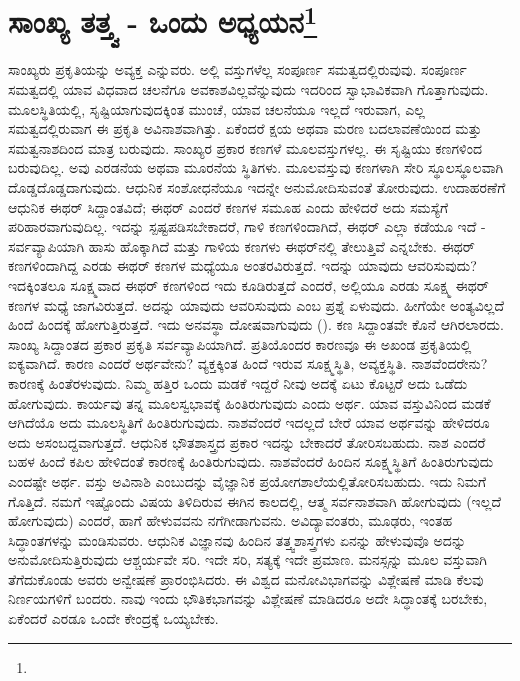 
\chapter[ಸಾಂಖ್ಯ ತತ್ತ್ವ - ಒಂದು ಅಧ್ಯಯನ]{ಸಾಂಖ್ಯ ತತ್ತ್ವ - ಒಂದು ಅಧ್ಯಯನ\protect\footnote{}}

ಸಾಂಖ್ಯರು ಪ್ರಕೃತಿಯನ್ನು ಅವ್ಯಕ್ತ ಎನ್ನುವರು. ಅಲ್ಲಿ ವಸ್ತುಗಳೆಲ್ಲ ಸಂಪೂರ್ಣ ಸಮತ್ವದಲ್ಲಿರುವುವು. ಸಂಪೂರ್ಣ ಸಮತ್ವದಲ್ಲಿ ಯಾವ ವಿಧವಾದ ಚಲನೆಗೂ ಅವಕಾಶವಿಲ್ಲವೆನ್ನುವುದು ಇದರಿಂದ ಸ್ವಾಭಾವಿಕವಾಗಿ ಗೊತ್ತಾಗುವುದು. ಮೂಲಸ್ಥಿತಿಯಲ್ಲಿ, ಸೃಷ್ಟಿಯಾಗುವುದಕ್ಕಿಂತ ಮುಂಚೆ, ಯಾವ ಚಲನೆಯೂ ಇಲ್ಲದೆ ಇರುವಾಗ, ಎಲ್ಲ ಸಮತ್ವದಲ್ಲಿರುವಾಗ ಈ ಪ್ರಕೃತಿ ಅವಿನಾಶವಾಗಿತ್ತು. ಏಕೆಂದರೆ ಕ್ಷಯ ಅಥವಾ ಮರಣ ಬದಲಾವಣೆಯಿಂದ ಮತ್ತು ಸಮತ್ವನಾಶದಿಂದ ಮಾತ್ರ ಬರುವುದು. ಸಾಂಖ್ಯರ ಪ್ರಕಾರ ಕಣಗಳೆ ಮೂಲವಸ್ತುಗಳಲ್ಲ. ಈ ಸೃಷ್ಟಿಯು ಕಣಗಳಿಂದ ಬರುವುದಿಲ್ಲ. ಅವು ಎರಡನೆಯ ಅಥವಾ ಮೂರನೆಯ ಸ್ಥಿತಿಗಳು. ಮೂಲವಸ್ತುವು ಕಣಗಳಾಗಿ ಸೇರಿ ಸ್ಥೂಲಸ್ಥೂಲವಾಗಿ ದೊಡ್ಡದೊಡ್ಡದಾಗುವುದು. ಆಧುನಿಕ ಸಂಶೋಧನೆಯೂ ಇದನ್ನೇ ಅನುಮೋದಿಸುವಂತೆ ತೋರುವುದು. ಉದಾಹರಣೆಗೆ ಆಧುನಿಕ ಈಥರ್ ಸಿದ್ದಾಂತವಿದೆ; ಈಥರ್ ಎಂದರೆ ಕಣಗಳ ಸಮೂಹ ಎಂದು ಹೇಳಿದರೆ ಅದು ಸಮಸ್ಯೆಗೆ ಪರಿಹಾರವಾಗುವುದಿಲ್ಲ. ಇದನ್ನು ಸ್ಪಷ್ಟಪಡಿಸಬೇಕಾದರೆ, ಗಾಳಿ ಕಣಗಳಿಂದಾಗಿದೆ, ಈಥರ್‌ ಎಲ್ಲಾ ಕಡೆಯೂ ಇದೆ - ಸರ್ವವ್ಯಾಪಿಯಾಗಿ ಹಾಸು ಹೊಕ್ಕಾಗಿದೆ ಮತ್ತು ಗಾಳಿಯ ಕಣಗಳು ಈಥರ್‌ನಲ್ಲಿ ತೇಲುತ್ತಿವೆ ಎನ್ನಬೇಕು. ಈಥರ್ ಕಣಗಳಿಂದಾಗಿದ್ದ ಎರಡು ಈಥರ್ ಕಣಗಳ ಮಧ್ಯೆಯೂ ಅಂತರವಿರುತ್ತದೆ. ಇದನ್ನು ಯಾವುದು ಆವರಿಸುವುದು? ಇದಕ್ಕಿಂತಲೂ ಸೂಕ್ಷ್ಮವಾದ ಈಥರ್ ಕಣಗಳಿಂದ ಇದು ಕೂಡಿರುತ್ತದೆ ಎಂದರೆ, ಅಲ್ಲಿಯೂ ಎರಡು ಸೂಕ್ಷ್ಮ ಈಥರ್ ಕಣಗಳ ಮಧ್ಯೆ ಜಾಗವಿರುತ್ತದೆ. ಅದನ್ನು ಯಾವುದು ಆವರಿಸುವುದು ಎಂಬ ಪ್ರಶ್ನೆ ಏಳುವುದು. ಹೀಗೆಯೇ ಅಂತ್ಯವಿಲ್ಲದೆ ಹಿಂದೆ ಹಿಂದಕ್ಕೆ ಹೋಗುತ್ತಿರುತ್ತದೆ. ಇದು ಅನವಸ್ಥಾ ದೋಷವಾಗುವುದು (). ಕಣ ಸಿದ್ದಾಂತವೇ ಕೊನೆ ಆಗಿರಲಾರದು. ಸಾಂಖ್ಯ ಸಿದ್ದಾಂತದ ಪ್ರಕಾರ ಪ್ರಕೃತಿ ಸರ್ವವ್ಯಾಪಿಯಾಗಿದೆ. ಪ್ರತಿಯೊಂದರ ಕಾರಣವೂ ಈ ಅಖಂಡ ಪ್ರಕೃತಿಯಲ್ಲಿ ಐಕ್ಯವಾಗಿದೆ. ಕಾರಣ ಎಂದರೆ ಅರ್ಥವೇನು? ವ್ಯಕ್ತಕ್ಕಿಂತ ಹಿಂದೆ ಇರುವ ಸೂಕ್ಷ್ಮಸ್ಥಿತಿ, ಅವ್ಯಕ್ತಸ್ಥಿತಿ. ನಾಶವೆಂದರೇನು? ಕಾರಣಕ್ಕೆ ಹಿಂತೆರಳುವುದು. ನಿಮ್ಮ ಹತ್ತಿರ ಒಂದು ಮಡಕೆ ಇದ್ದರೆ ನೀವು ಅದಕ್ಕೆ ಏಟು ಕೊಟ್ಟರೆ ಅದು ಒಡೆದು ಹೋಗುವುದು. ಕಾರ್ಯವು ತನ್ನ ಮೂಲಸ್ವಭಾವಕ್ಕೆ ಹಿಂತಿರುಗುವುದು ಎಂದು ಅರ್ಥ. ಯಾವ ವಸ್ತುವಿನಿಂದ ಮಡಕೆ ಆಗಿದೆಯೊ ಅದು ಮೂಲಸ್ಥಿತಿಗೆ ಹಿಂತಿರುಗುವುದು. ನಾಶವೆಂದರೆ ಇದಲ್ಲದೆ ಬೇರೆ ಯಾವ ಅರ್ಥವನ್ನು ಹೇಳಿದರೂ ಅದು ಅಸಂಬದ್ದವಾಗುತ್ತದೆ. ಆಧುನಿಕ ಭೌತಶಾಸ್ತ್ರದ ಪ್ರಕಾರ ಇದನ್ನು ಬೇಕಾದರೆ ತೋರಿಸಬಹುದು. ನಾಶ ಎಂದರೆ ಬಹಳ ಹಿಂದೆ ಕಪಿಲ ಹೇಳಿದಂತೆ ಕಾರಣಕ್ಕೆ ಹಿಂತಿರುಗುವುದು. ನಾಶವೆಂದರೆ ಹಿಂದಿನ ಸೂಕ್ಷ್ಮಸ್ಥಿತಿಗೆ ಹಿಂತಿರುಗುವುದು ಎಂದಷ್ಟೇ ಅರ್ಥ. ವಸ್ತು ಅವಿನಾಶಿ ಎಂಬುದನ್ನು ವೈಜ್ಞಾನಿಕ ಪ್ರಯೋಗಶಾಲೆಯಲ್ಲಿ\break ತೋರಿಸಬಹುದು. ಇದು ನಿಮಗೆ ಗೊತ್ತಿದೆ. ನಮಗೆ ಇಷ್ಟೊಂದು ವಿಷಯ ತಿಳಿದಿರುವ ಈಗಿನ ಕಾಲದಲ್ಲಿ, ಆತ್ಮ ಸರ್ವನಾಶವಾಗಿ ಹೋಗುವುದು (ಇಲ್ಲದೆ ಹೋಗುವುದು) ಎಂದರೆ, ಹಾಗೆ ಹೇಳುವವನು ನಗೆಗೀಡಾಗುವನು. ಅವಿದ್ಯಾವಂತರು, ಮೂಢರು, ಇಂತಹ ಸಿದ್ಧಾಂತಗಳನ್ನು ಮಂಡಿಸುವರು. ಆಧುನಿಕ ವಿಜ್ಞಾನವು ಹಿಂದಿನ ತತ್ತ್ವಶಾಸ್ತ್ರಗಳು ಏನನ್ನು ಹೇಳುವುವೊ ಅದನ್ನು ಅನುಮೋದಿಸುತ್ತಿರುವುದು ಆಶ್ಚರ್ಯವೇ ಸರಿ. ಇದೇ ಸರಿ, ಸತ್ಯಕ್ಕೆ ಇದೇ ಪ್ರಮಾಣ. ಮನಸ್ಸನ್ನು ಮೂಲ ವಸ್ತುವಾಗಿ ತೆಗೆದುಕೊಂಡು ಅವರು ಅನ್ವೇಷಣೆ ಪ್ರಾರಂಭಿಸಿದರು. ಈ ವಿಶ್ವದ ಮನೋವಿಭಾಗವನ್ನು ವಿಶ್ಲೇಷಣೆ ಮಾಡಿ ಕೆಲವು ನಿರ್ಣಯಗಳಿಗೆ ಬಂದರು. ನಾವು ಇಂದು ಭೌತಿಕಭಾಗವನ್ನು ವಿಶ್ಲೇಷಣೆ ಮಾಡಿದರೂ ಅದೇ ಸಿದ್ಧಾಂತಕ್ಕೆ ಬರಬೇಕು, ಏಕೆಂದರೆ ಎರಡೂ ಒಂದೇ ಕೇಂದ್ರಕ್ಕೆ ಒಯ್ಯಬೇಕು.

